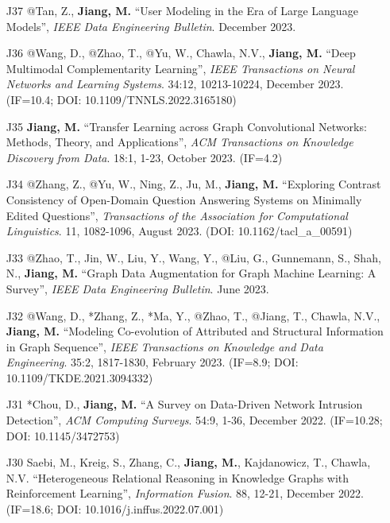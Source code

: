 \documentclass[10pt]{article}
\newenvironment{myindentpar}[1]%
{\begin{list}{}%
         {\setlength{\leftmargin}{#1}}%
         \item[]%
}
{\end{list}}
\newcounter{list}
\begin{document}
\begin{myindentpar}{0.00cm}
\begin{enumerate}[leftmargin=.5cm]
\item[J37] @Tan, Z., \textbf{Jiang, M.} ``User Modeling in the Era of Large Language Models'', \textit{IEEE Data Engineering Bulletin}. December 2023.

\item[J36] @Wang, D., @Zhao, T., @Yu, W., Chawla, N.V., \textbf{Jiang, M.} ``Deep Multimodal Complementarity Learning'', \textit{IEEE Transactions on Neural Networks and Learning Systems}. 34:12, 10213-10224, December 2023. (IF=10.4; DOI: 10.1109/TNNLS.2022.3165180)

\item[J35] \textbf{Jiang, M.} ``Transfer Learning across Graph Convolutional Networks: Methods, Theory, and Applications'', \textit{ACM Transactions on Knowledge Discovery from Data}. 18:1, 1-23, October 2023. (IF=4.2)	

\item[J34] @Zhang, Z., @Yu, W., Ning, Z., Ju, M., \textbf{Jiang, M.} ``Exploring Contrast Consistency of Open-Domain Question Answering Systems on Minimally Edited Questions'', \textit{Transactions of the Association for Computational Linguistics}. 11, 1082-1096, August 2023. (DOI: 10.1162/tacl\_a\_00591)
	
\item[J33] @Zhao, T., Jin, W., Liu, Y., Wang, Y., @Liu, G., Gunnemann, S., Shah, N., \textbf{Jiang, M.} ``Graph Data Augmentation for Graph Machine Learning: A Survey'', \textit{IEEE Data Engineering Bulletin}. June 2023.
	
\item[J32] @Wang, D., *Zhang, Z., *Ma, Y., @Zhao, T., @Jiang, T., Chawla, N.V., \textbf{Jiang, M.} ``Modeling Co-evolution of Attributed and Structural Information in Graph Sequence'', \textit{IEEE Transactions on Knowledge and Data Engineering}. 35:2, 1817-1830, February 2023. (IF=8.9; DOI: 10.1109/TKDE.2021.3094332)

\item[J31] *Chou, D., \textbf{Jiang, M.} ``A Survey on Data-Driven Network Intrusion Detection'', \textit{ACM Computing Surveys}. 54:9, 1-36, December 2022. (IF=10.28; DOI: 10.1145/3472753)

\item[J30] Saebi, M., Kreig, S., Zhang, C., \textbf{Jiang, M.}, Kajdanowicz, T., Chawla, N.V. ``Heterogeneous Relational Reasoning in Knowledge Graphs with Reinforcement Learning'', \textit{Information Fusion}. 88, 12-21, December 2022. (IF=18.6; DOI: 10.1016/j.inffus.2022.07.001)
	

\end{enumerate}
\end{myindentpar}
\end{document}
